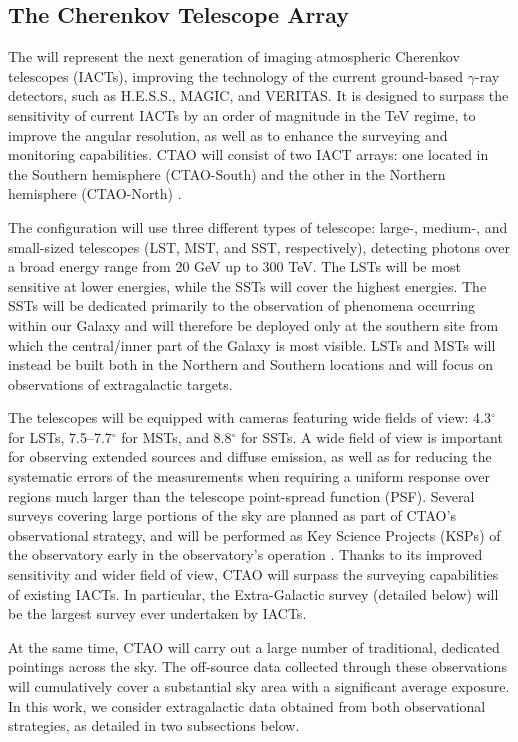 \subsection{The Cherenkov Telescope Array}\label{sec:CTA}
The \CTAO will represent the next generation of imaging atmospheric Cherenkov telescopes (IACTs), improving the technology of the current ground-based $\gamma$-ray detectors, such as H.E.S.S., MAGIC, and VERITAS. It is designed to surpass the sensitivity of current IACTs by an order of magnitude in the TeV regime, to improve the angular resolution, as well as to enhance the surveying and monitoring capabilities. CTAO  will consist of two IACT arrays: one located in the Southern hemisphere (CTAO-South) and the other in the Northern hemisphere (CTAO-North) \cite{CTAConsortium:2017dvg}.

The configuration will use three different types of telescope: large-, medium-, and small-sized telescopes (LST, MST, and SST, respectively), detecting photons over a broad energy range from 20 GeV up to 300 TeV. The LSTs will be most sensitive at lower energies, while the SSTs will cover the highest energies. The SSTs will be {dedicated primarily to the observation of}  phenomena occurring within our Galaxy and will {therefore be deployed only at the southern site from which} the central/inner part of the Galaxy is most visible. LSTs and MSTs will instead be built both in the Northern and Southern locations and will focus on observations of extragalactic targets.

The telescopes will be equipped with cameras featuring wide fields of view: 
{4.3$^\circ$} for LSTs, {7.5--7.7$^\circ$} for MSTs, and {8.8$^\circ$} for SSTs. A wide field of view is important for observing extended sources and diffuse emission, as well as for reducing the systematic errors of the measurements when requiring a uniform response over regions much larger than the telescope point-spread function (PSF). Several surveys covering large portions of the sky are planned as part of CTAO's observational strategy, and will be performed as Key Science Projects (KSPs) of the observatory early in the observatory's operation 
\cite{CTAConsortium:2017dvg}. Thanks to its improved sensitivity and wider field of view, {CTAO will surpass} the surveying capabilities of existing IACTs. In particular, the Extra-Galactic survey (detailed below) { will be} the largest survey ever undertaken by IACTs.   

At the same time, CTAO will carry out a large number of traditional, dedicated pointings across the sky. The off-source data collected through these observations will cumulatively cover a substantial sky area with a significant average exposure. In this work, we consider extragalactic data obtained from both observational strategies, as detailed in two subsections below.

